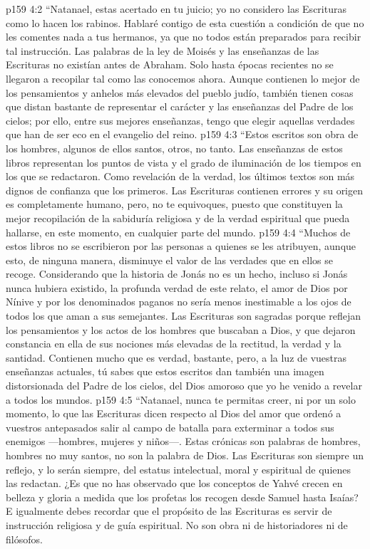 \vs p159 4:2 \pc “Natanael, estas acertado en tu juicio; yo no considero las Escrituras como lo hacen los rabinos. Hablaré contigo de esta cuestión a condición de que no les comentes nada a tus hermanos, ya que no todos están preparados para recibir tal instrucción. Las palabras de la ley de Moisés y las enseñanzas de las Escrituras no existían antes de Abraham. Solo hasta épocas recientes no se llegaron a recopilar tal como las conocemos ahora. Aunque contienen lo mejor de los pensamientos y anhelos más elevados del pueblo judío, también tienen cosas que distan bastante de representar el carácter y las enseñanzas del Padre de los cielos; por ello, entre sus mejores enseñanzas, tengo que elegir aquellas verdades que han de ser eco en el evangelio del reino.
\vs p159 4:3 “Estos escritos son obra de los hombres, algunos de ellos santos, otros, no tanto. Las enseñanzas de estos libros representan los puntos de vista y el grado de iluminación de los tiempos en los que se redactaron. Como revelación de la verdad, los últimos textos son más dignos de confianza que los primeros. Las Escrituras contienen errores y su origen es completamente humano, pero, no te equivoques, puesto que constituyen la mejor recopilación de la sabiduría religiosa y de la verdad espiritual que pueda hallarse, en este momento, en cualquier parte del mundo.
\vs p159 4:4 “Muchos de estos libros no se escribieron por las personas a quienes se les atribuyen, aunque esto, de ninguna manera, disminuye el valor de las verdades que en ellos se recoge. Considerando que la historia de Jonás no es un hecho, incluso si Jonás nunca hubiera existido, la profunda verdad de este relato, el amor de Dios por Nínive y por los denominados paganos no sería menos inestimable a los ojos de todos los que aman a sus semejantes. Las Escrituras son sagradas porque reflejan los pensamientos y los actos de los hombres que buscaban a Dios, y que dejaron constancia en ella de sus nociones más elevadas de la rectitud, la verdad y la santidad. Contienen mucho que es verdad, bastante, pero, a la luz de vuestras enseñanzas actuales, tú sabes que estos escritos dan también una imagen distorsionada del Padre de los cielos, del Dios amoroso que yo he venido a revelar a todos los mundos.
\vs p159 4:5 “Natanael, nunca te permitas creer, ni por un solo momento, lo que las Escrituras dicen respecto al Dios del amor que ordenó a vuestros antepasados salir al campo de batalla para exterminar a todos sus enemigos ---hombres, mujeres y niños---. Estas crónicas son palabras de hombres, hombres no muy santos, no son la palabra de Dios. Las Escrituras son siempre un reflejo, y lo serán siempre, del estatus intelectual, moral y espiritual de quienes las redactan. ¿Es que no has observado que los conceptos de Yahvé crecen en belleza y gloria a medida que los profetas los recogen desde Samuel hasta Isaías? E igualmente debes recordar que el propósito de las Escrituras es servir de instrucción religiosa y de guía espiritual. No son obra ni de historiadores ni de filósofos.
